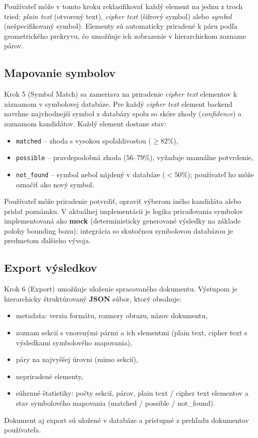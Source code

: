 Používateľ môže v tomto kroku reklasifikovať každý element na jednu z troch tried: \textit{plain text} (otvorený text), \textit{cipher text} (šifrový symbol) alebo \textit{symbol} (nešpecifikovaný symbol). Elementy sú automaticky priradené k páru podľa geometrického prekryvu, čo umožňuje ich zobrazenie v hierarchickom zozname párov.

\subsection{Mapovanie symbolov}

Krok 5 (Symbol Match) sa zameriava na priradenie \textit{cipher text} elementov k záznamom v symbolovej databáze. Pre každý \textit{cipher text} element backend navrhne najvhodnejší symbol z databázy spolu so skóre zhody (\textit{confidence}) a zoznamom kandidátov. Každý element dostane stav:
\begin{itemize}
    \item \texttt{matched} – zhoda s vysokou spoľahlivosťou ($\geq 82\%$),
    \item \texttt{possible} – pravdepodobná zhoda ($56\text{–}79\%$), vyžaduje manuálne potvrdenie,
    \item \texttt{not\_found} – symbol nebol nájdený v databáze ($< 50\%$); používateľ ho môže označiť ako nový symbol.
\end{itemize}

Používateľ môže priradenie potvrdiť, opraviť výberom iného kandidáta alebo pridať poznámku. V aktuálnej implementácii je logika priraďovania symbolov implementovaná ako \textbf{mock} (deterministicky generované výsledky na základe polohy bounding boxu); integrácia so skutočnou symbolovou databázou je predmetom ďalšieho vývoja.

\subsection{Export výsledkov}

Krok 6 (Export) umožňuje uloženie spracovaného dokumentu. Výstupom je hierarchicky štruktúrovaný \textbf{JSON} súbor, ktorý obsahuje:
\begin{itemize}
    \item metadata: verzia formátu, rozmery obrazu, názov dokumentu,
    \item zoznam sekcií s vnorenými pármi a ich elementmi (plain text, cipher text s výsledkami symbolového mapovania),
    \item páry na najvyššej úrovni (mimo sekcií),
    \item nepriradené elementy,
    \item súhrnné štatistiky: počty sekcií, párov, plain text / cipher text elementov a stav symbolového mapovania (matched / possible / not\_found).
\end{itemize}

Dokument aj export sú uložené v databáze a prístupné z prehľadu dokumentov používateľa.
